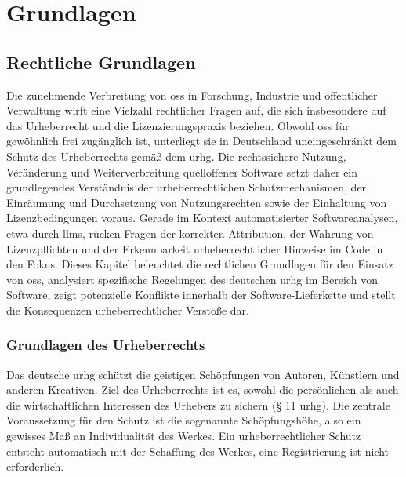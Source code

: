 \chapter{Grundlagen}\label{ch:grundlagen}


\section{Rechtliche Grundlagen}\label{sec:rechtliches}

Die zunehmende Verbreitung von \gls{oss} in Forschung, Industrie und öffentlicher Verwaltung wirft eine Vielzahl rechtlicher Fragen auf, die sich insbesondere auf das Urheberrecht und die Lizenzierungspraxis beziehen.
Obwohl \gls{oss} für gewöhnlich frei zugänglich ist, unterliegt sie in Deutschland uneingeschränkt dem Schutz des Urheberrechts gemäß dem \gls{urhg}\autocite{noauthor_urhg_nodate}.
Die rechtssichere Nutzung, Veränderung und Weiterverbreitung quelloffener Software setzt daher ein grundlegendes Verständnis der urheberrechtlichen Schutzmechanismen, der Einräumung und Durchsetzung von Nutzungsrechten sowie der Einhaltung von Lizenzbedingungen voraus.
Gerade im Kontext automatisierter Softwareanalysen, etwa durch \glspl{llm}, rücken Fragen der korrekten Attribution, der Wahrung von Lizenzpflichten und der Erkennbarkeit urheberrechtlicher Hinweise im Code in den Fokus.
Dieses Kapitel beleuchtet die rechtlichen Grundlagen für den Einsatz von \gls{oss}, analysiert spezifische Regelungen des deutschen \gls{urhg} im Bereich von Software, zeigt potenzielle Konflikte innerhalb der Software-Lieferkette und stellt die Konsequenzen urheberrechtlicher Verstöße dar.


\subsection{Grundlagen des Urheberrechts}\label{subsec:grundlagen-des-urheberrechts}

Das deutsche \acrlong{urhg} schützt die geistigen Schöpfungen von Autoren, Künstlern und anderen Kreativen.
Ziel des Urheberrechts ist es, sowohl die persönlichen als auch die wirtschaftlichen Interessen des Urhebers zu sichern (§ 11 \gls{urhg}).
Die zentrale Voraussetzung für den Schutz ist die sogenannte Schöpfungshöhe, also ein gewisses Maß an Individualität des Werkes.
Ein urheberrechtlicher Schutz entsteht automatisch mit der Schaffung des Werkes, eine Registrierung ist nicht erforderlich.

